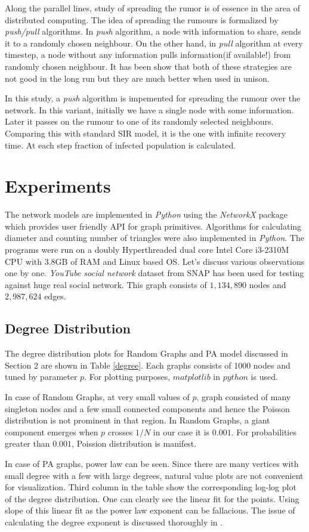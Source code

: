 \documentclass[12pt]{article}
\begin{document}
\par Along the parallel lines, study of spreading the rumor is of essence in the area of distributed computing. The idea of spreading the rumours is formalized by {\it push/pull} algorithms. In {\it push} algorithm, a node with information to share, sends it to a randomly chosen neighbour. On the other hand, in {\it pull} algorithm at every timestep, a node without any information pulls information(if available!) from randomly chosen neighbour. It has been show that both of these strategies are not good in the long run but they are much better when used in unison.
\par In this study, a {\it push} algorithm is impemented for spreading the rumour over the network. In this variant, initially we have a single node with some information. Later it passes on the rumour to one of its randomly selected neighbours. Comparing this with standard SIR model, it is the one with infinite recovery time. At each step fraction of infected population is calculated.


\section{Experiments}
The network models are implemented in {\it Python} using the {\it NetworkX} package which provides user friendly API for graph primitives. Algorithms for calculating diameter and counting number of triangles were also implemented in {\it Python}. The programs were run on a doubly Hyperthreaded dual core Intel\textsuperscript{\textregistered} Core i3-2310M CPU with 3.8GB of RAM and Linux based OS. Let's discuss various observations one by one. {\it YouTube social network} dataset from SNAP\cite{snap} has been used for testing against huge real social network. This graph consists of $1,134,890$ nodes and $2,987,624$ edges.
\subsection{Degree Distribution}
The degree distribution plots for Random Graphs and PA model discussed in Section 2 are shown in Table \ref{degree}. Each graphs consists of 1000 nodes and tuned by parameter $p$. For plotting purposes, $matplotlib$ in $python$ is used.
\par In case of Random Graphs, at very small values of $p$, graph consisted of many singleton nodes and a few small connected components and hence the Poisson distribution is not prominent in that region. In Random Graphs, a giant component emerges when $p$ crosses $1/N$ in our case it is $0.001$. For probabilities greater than $0.001$, Poission distribution is manifest.
\par In case of PA graphs, power law can be seen. Since there are many vertices with small degree with a few with large degrees, natural value plots are not convenient for visualization. Third column in the table show the corresponding log-log plot of the degree distribution. One can clearly see the linear fit for the points. Using slope of this linear fit as the power law exponent can be fallacious. The issue of calculating the degree exponent is discussed thoroughly in \cite{pareto}.
\end{document}
